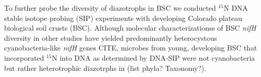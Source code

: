 To further probe the diversity of diazotrophs in BSC we conducted $^{15}$N DNA stable isotope probing (SIP) experiments with developing Colorado plateau biological soil crusts (BSC). Although molecular characterizationss of BSC \textit{nifH} diversity in other studies have yielded predominantly heterocystous cyanobacteria-like \textit{nifH} genes CITE, microbes from young, developing BSC that incorporated $^{15}$N into DNA as determined by DNA-SIP were not cyanobacteria but rather heterotrophic diazotrphs in (list phyla? Taxonomy?).


